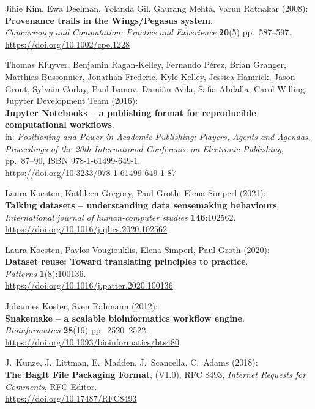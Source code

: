 \begin{thebibliography}{9}
Jihie Kim, Ewa Deelman, Yolanda Gil, Gaurang Mehta, Varun
Ratnakar (2008):\\
\textbf{Provenance trails in the Wings/Pegasus system}.\\
\emph{Concurrency and Computation: Practice and Experience}
\textbf{20}(5) pp.~587--597.\\
\url{https://doi.org/10.1002/cpe.1228}

Thomas Kluyver, Benjamin Ragan-Kelley, Fernando Pérez, Brian
Granger, Matthias Bussonnier, Jonathan Frederic, Kyle Kelley, Jessica
Hamrick, Jason Grout, Sylvain Corlay, Paul Ivanov, Damián Avila, Safia
Abdalla, Carol Willing, Jupyter Development Team (2016):\\
\textbf{Jupyter Notebooks -- a publishing format for reproducible
computational workflows}.\\
in: \emph{Positioning and Power in Academic Publishing: Players, Agents
and Agendas},\\
\emph{Proceedings of the 20th International Conference on Electronic
Publishing}, pp.~87--90, ISBN 978-1-61499-649-1.\\
\url{https://doi.org/10.3233/978-1-61499-649-1-87}

Laura Koesten, Kathleen Gregory, Paul Groth, Elena Simperl
(2021):\\
\textbf{Talking datasets -- understanding data sensemaking
behaviours}.\\
\emph{International journal of human-computer studies}
\textbf{146}:102562.\\
\url{https://doi.org/10.1016/j.ijhcs.2020.102562}

Laura Koesten, Pavlos Vougiouklis, Elena Simperl, Paul Groth
(2020):\\
\textbf{Dataset reuse: Toward translating principles to practice}.\\
\emph{Patterns} \textbf{1}(8):100136.\\
\url{https://doi.org/10.1016/j.patter.2020.100136}

Johannes Köster, Sven Rahmann (2012):\\
\textbf{Snakemake -- a scalable bioinformatics workflow engine}.\\
\emph{Bioinformatics} \textbf{28}(19) pp.~2520--2522.\\
\url{https://doi.org/10.1093/bioinformatics/bts480}

J.~Kunze, J.~Littman, E.~Madden, J.~Scancella, C.~Adams
(2018):\\
\textbf{The BagIt File Packaging Format}, (V1.0), RFC 8493,
\emph{Internet Requests for Comments}, RFC Editor.\\
\url{https://doi.org/10.17487/RFC8493}


\end{thebibliography}
